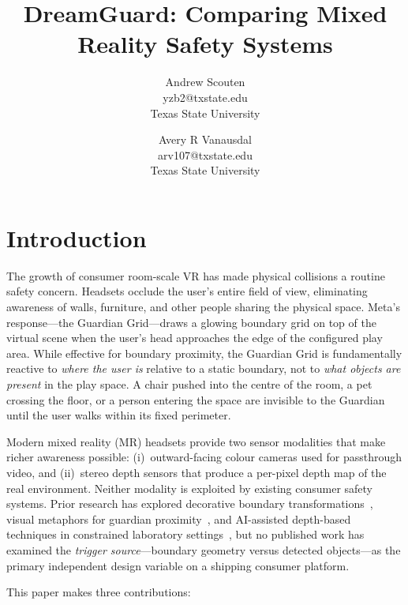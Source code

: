 \documentclass{styling/vgtc} %
\title{DreamGuard: Comparing Mixed Reality Safety Systems}
\author{Andrew Scouten\\ %
        \scriptsize{yzb2@txstate.edu}\\ %
        \scriptsize Texas State University
\and Avery R Vanausdal\\ %
        \scriptsize{arv107@txstate.edu}\\ %
        \scriptsize Texas State University}
\begin{document}
\maketitle

\section{Introduction}

The growth of consumer room-scale VR has made physical collisions a
routine safety concern. Headsets occlude the user's entire field of view,
eliminating awareness of walls, furniture, and other people sharing the
physical space. Meta's response---the Guardian Grid---draws a glowing
boundary grid on top of the virtual scene when the user's head
approaches the edge of the configured play area. While effective for
boundary proximity, the Guardian Grid is fundamentally reactive to
\emph{where the user is} relative to a static boundary, not to
\emph{what objects are present} in the play space. A chair pushed into
the centre of the room, a pet crossing the floor, or a person entering
the space are invisible to the Guardian until the user walks within its
fixed perimeter.

Modern mixed reality (MR) headsets provide two sensor modalities that
make richer awareness possible: (i)~outward-facing colour cameras used
for passthrough video, and (ii)~stereo depth sensors that produce a
per-pixel depth map of the real environment. Neither modality is
exploited by existing consumer safety systems. Prior research has
explored decorative boundary transformations~\cite{qin2024brokenwall},
visual metaphors for guardian proximity~\cite{wu2023guardian}, and
AI-assisted depth-based techniques in constrained laboratory
settings~\cite{sobo2024}, but no published work has examined the
\emph{trigger source}---boundary geometry versus detected objects---as
the primary independent design variable on a shipping consumer platform.

This paper makes three contributions:
\end{document}
